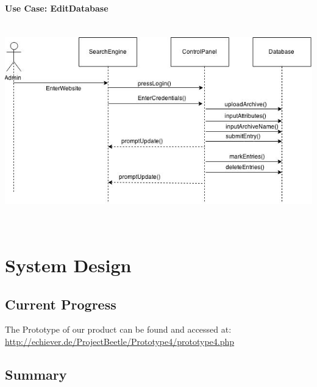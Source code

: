 \documentclass[12pt,a4paper]{article}
\begin{document}
{\bf Use Case: EditDatabase}\\

\includegraphics[height=92mm]{Sequence3.jpg}

\newpage

\section{System Design}
\subsection{Current Progress}

The Prototype of our product can be found and accessed at: \url{http://echiever.de/ProjectBeetle/Prototype4/prototype4.php}
\subsection{Summary}
\end{document}
